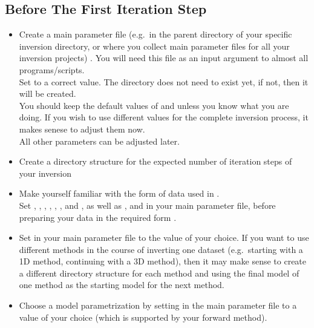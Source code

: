 \subsection*{Before The First Iteration Step}
%
\begin{itemize}
\item Create a main parameter file (e.g.\ in the parent directory of your specific inversion directory, 
or where you collect main parameter files for all your inversion projects)
. You will need this file as an input argument to almost all programs/scripts.\\
Set  to a correct value. 
The directory does not need to exist yet, if not, then it will be created. \\
You should keep the default values of  and  unless
you know what you are doing. If you wish to use different values for the complete inversion process, 
it makes senese to adjust them now.\\
All other parameters can be adjusted later. 
%
\item Create a directory structure for the expected number of iteration steps of your inversion 
%
\item Make yourself familiar with the form of data used in \ASKI {}. \\
  Set , , , 
  , , 
  , and , as well as , 
   and   in your main 
  parameter file, before preparing your data in the required form .
%
\item Set  in your main 
parameter file to the value of your choice. If you want to use different methods in the course of 
inverting one dataset (e.g.\ starting with a 1D method, continuing with a 3D method), then it may make 
sense to create a different directory structure for each method and using the final model of one method
as the starting model for the next method.
%
\item Choose a model parametrization by setting  in the main parameter file 
to a value of your choice (which is supported by your forward method).
%
\end{itemize}
%

